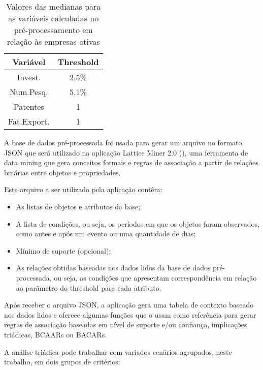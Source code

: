 \documentclass[12pt]{article}
\begin{document}
\begin{table}[ht!]
    \centering
    \begin{tabular}{||c c||} 
         \hline
         Variável & Threshold \\ [0.5ex] 
         \hline\hline
         Invest. & 2,5\% \\
         Num.Pesq. & 5,1\% \\
         Patentes & 1 \\
         Fat.Export. & 1 \\ [1ex] 
         \hline
    \end{tabular}
    \caption{Valores das medianas para as variáveis calculadas no pré-processamento em relação às empresas ativas}
    \label{tabela:1}
\end{table}

A base de dados pré-processada foi usada para gerar um arquivo no formato JSON que será utilizado na aplicação Lattice Miner 2.0 (\cite{missaoui2017lattice}), uma ferramenta de data mining que gera conceitos formais e regras de associação a partir de relações binárias entre objetos e propriedades.

Este arquivo a ser utilizado pela aplicação contêm:
\begin{itemize}
    \item As listas de objetos e atributos da base;
    \item A lista de condições, ou seja, os períodos em que os objetos foram observados, como antes e após um evento ou uma quantidade de dias;
    \item Mínimo de suporte (opcional);
    \item As relações obtidas baseadas nos dados lidos da base de dados pré-processada, ou seja, as condições que apresentam correspondência em relação ao parâmetro do threshold para cada atributo.
\end{itemize}

Após receber o arquivo JSON, a aplicação gera uma tabela de contexto baseado nos dados lidos e oferece algumas funções que o usam como referência para gerar regras de associação baseadas em nível de suporte e/ou confiança, implicações triádicas, BCAARs ou BACARs.


A análise triádica pode trabalhar com variados cenários agrupados, neste trabalho, em dois grupos de critérios:
\end{document}

